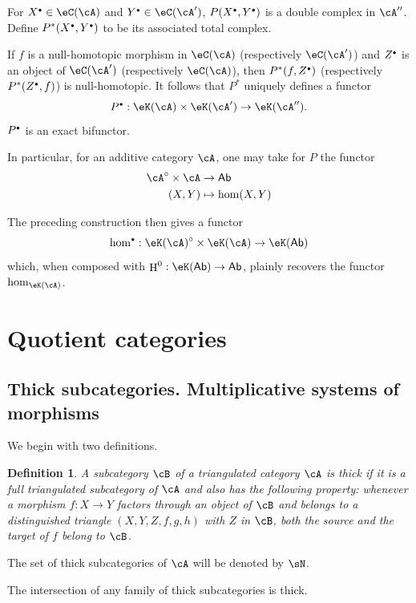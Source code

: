 \documentclass[12pt,oneside,english]{smfbook}
\DeclareMathOperator{\h}{H}
\newtheorem{definition}[subsubsection]{Definition}
\let\oldbullet\bullet
\renewcommand{\bullet}{\textnormal{\tiny$\oldbullet$}}
\begin{document}
For $X^\bullet\in\eC(\cA)$ and $Y^\bullet\in\eC(\cA')$, $P(X^\bullet,Y^\bullet)$ is a double complex in $\cA''$. Define $P^\ast(X^\bullet,Y^\bullet)$ to be its associated total complex.

If $f$ is a null-homotopic morphism in $\eC(\cA)$ (respectively $\eC(\cA')$) and $Z^\bullet$ is an object of $\eC(\cA')$ (respectively $\eC(\cA)$), then $P^\ast(f,Z^\bullet)$ (respectively $P^\ast(Z^\bullet,f)$) is null-homotopic. It follows that $P^\ast$ uniquely defines a functor
\[
  P^\bullet:\eK(\cA) \times \eK(\cA') \to \eK(\cA'') \text{.}
\]
$P^\bullet$ is an exact bifunctor.

In particular, for an additive category $\cA$, one may take for $P$ the functor
\begin{align*}
  \cA^\circ\times \cA &\to \mathsf{Ab} \\
  (X,Y) &\mapsto \hom(X,Y)
\end{align*}

The preceding construction then gives a functor
\[
  \hom^\bullet:\eK(\cA)^\circ \times \eK(\cA) \to \eK(\mathsf{Ab})
\]
which, when composed with $\h^0:\eK(\mathsf{Ab})\to\mathsf{Ab}$, plainly recovers the functor $\hom_{\eK(\cA)}$.

\section{Quotient categories}\label{VIII:2}

\subsection{Thick subcategories. Multiplicative systems of morphisms}\label{VIII:2-1}

We begin with two definitions.

\begin{definition}\label{VIII:2-1-1}
A subcategory $\cB$ of a triangulated category $\cA$ is \emph{thick} if it is a full triangulated subcategory of $\cA$ and also has the following property: whenever a morphism $f:X\to Y$ factors through an object of $\cB$ and belongs to a distinguished triangle $(X,Y,Z,f,g,h)$ with $Z$ in $\cB$, both the source and the target of $f$ belong to $\cB$.
\end{definition}

The set of thick subcategories of $\cA$ will be denoted by $\sN$.

The intersection of any family of thick subcategories is thick.
\end{document}
